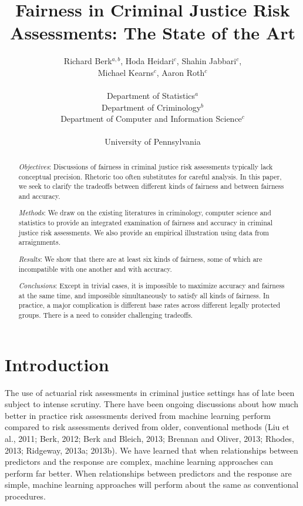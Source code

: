 \documentclass[12pt]{article}
\title{Fairness in Criminal Justice Risk Assessments: The State of the Art}
\author{Richard Berk$^{a,b}$, Hoda Heidari$^{c}$,  Shahin Jabbari$^{c}$,  \\ Michael Kearns$^{c}$, Aaron Roth$^{c}$ \\ \\
Department of Statistics$^{a}$ \\
Department of Criminology$^{b}$ \\
Department of Computer and Information Science$^{c}$ \\ \\
University of Pennsylvania}
\begin{document}
\maketitle
\begin{abstract}
\textit{Objectives}: Discussions of fairness in criminal justice risk assessments typically lack conceptual precision. Rhetoric too often substitutes for careful analysis. In this paper, we seek to clarify the tradeoffs between different kinds of fairness and between fairness and accuracy.

\textit{Methods}: We draw on the existing literatures in criminology, computer science and statistics to provide an integrated examination of fairness and accuracy in criminal justice risk assessments. We also provide an empirical illustration using data from arraignments.

\textit{Results}: We show that there are at least six kinds of fairness, some of which are incompatible with one another and with accuracy.

\textit{Conclusions}: Except in trivial cases, it is impossible to maximize accuracy and fairness at the same time, and impossible simultaneously to satisfy all kinds of fairness. In practice, a major complication is different base rates across different legally protected groups. There is a need to consider challenging tradeoffs.
\end{abstract} 
\pagebreak                                      

\section{Introduction}

The use of actuarial risk assessments in criminal justice settings has of late been subject to intense scrutiny.  There have been ongoing discussions about how much better in practice risk assessments derived from machine learning perform compared to risk assessments derived from older, conventional methods (Liu et al., 2011; Berk, 2012; Berk and Bleich, 2013; Brennan and Oliver, 2013; Rhodes, 2013; Ridgeway, 2013a; 2013b). We have learned that when relationships between predictors and the response are complex, machine learning approaches can perform far better. When relationships between predictors and the response are simple, machine learning approaches will perform about the same as conventional procedures. 
\end{document}
